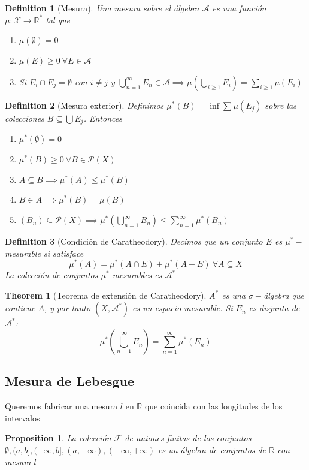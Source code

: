 \documentclass{myclass}
\newtheorem*{definition}{Definition}
\newtheorem*{theorem}{Theorem}
\newtheorem*{proposition}{Proposition}
\begin{document}
\begin{definition}[Mesura] Una mesura sobre el álgebra $\mathcal{A}$ es una función $\mu : \mathcal{X}\to \mathbb{R}^*$ tal que
  \begin{enumerate}[topsep=-6pt, itemsep=0pt]
    \item $\mu(\emptyset) = 0$
	\item  $\mu(E)\ge 0 \ \forall E \in \mathcal{A}$ 
	\item Si $E_i \cap E_j = \emptyset$ con $i\neq j$ y $\bigcup_{n=1}^\infty E_n\in \mathcal{A} \implies \displaystyle \mu\left( \bigcup_{i\ge 1} E_i \right) = \sum_{i\ge 1}\mu(E_{i})  $
  \end{enumerate}
\end{definition}

\begin{definition}[Mesura exterior]
Definimos $\displaystyle \mu^*(B) = \inf \sum\mu(E_j)$ sobre las colecciones $B\subseteq \bigcup E_j$. Entonces 
\begin{enumerate}[topsep=-6pt, itemsep=0pt]
  \item $\mu^*(\emptyset) = 0$
  \item $\mu^*(B)\ge 0 \ \forall B\in \mathcal{P}(X)$
  \item $A\subseteq B \implies \mu^*(A) \le \mu^* (B)$
  \item $B\in A \implies \mu^*(B) = \mu(B)$
  \item $(B_n)\subseteq \mathcal{P}(X) \implies \displaystyle \mu^* \left( \bigcup_{n=1}^\infty B_n \right) \le \sum_{n=1}^\infty \mu^*(B_n) $
\end{enumerate}
\end{definition}

\begin{definition}[Condición de Caratheodory] Decimos que un conjunto $E$ es $\mu^*-$mesurable si satisface
\[
\mu^*(A) = \mu^*(A \cap E) + \mu^*(A-E) \ \forall A\subseteq X
\] 
La colección de conjuntos $\mu^*$-mesurables es $\mathcal{A}^*$
\end{definition}

\begin{theorem}[Teorema de extensión de Caratheodory]
$A^*$ es una $\sigma-$álgebra que contiene $A$, y por tanto  $(X, \mathcal{A}^*)$ es un espacio mesurable. Si $E_n$ es disjunta de  $\mathcal{A}^*$:
\[
\mu^*\left( \bigcup_{n=1}^\infty E_n \right) = \sum_{n=1}^\infty \mu^*(E_n)
\] 

\end{theorem}

\subsection{Mesura de Lebesgue}
Queremos fabricar una mesura $l$ en $\mathbb{R}$ que coincida con las longitudes de los intervalos
\begin{proposition}
La colección $\mathcal{F}$ de uniones finitas de los conjuntos $\emptyset, (a, b], (-\infty, b], (a, +\infty), (-\infty, +\infty)$ es un álgebra de conjuntos de $\mathbb{R}$ con mesura $l$
\end{proposition}
\end{document}
